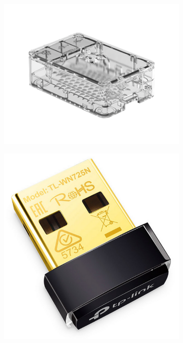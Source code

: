\documentclass[../Head/report.tex]{subfiles}
\begin{document}
\begin{figure}[H]
\begin{subfigure}[b]{.25\textwidth}
          \vspace{-2.0em}
        \caption{}
        \label{fig:raspberry_pi}
    \end{subfigure}
     \hspace{-0.5em}
        \begin{subfigure}[b]{.30\textwidth}
        \centering
        \includegraphics[width=1\linewidth]{../Figures/raspberry_pi/raspberry_pi_case.png}
         \vspace{-2.3em}
        \caption{}
        \label{fig:raspberry_pi_case}
    \end{subfigure}
            \begin{subfigure}[b]{.07\textwidth}
        \centering
        \includegraphics[width=1\linewidth]{../Figures/tpLinkac600.png}

\end{subfigure}
\end{figure}
\end{document}

